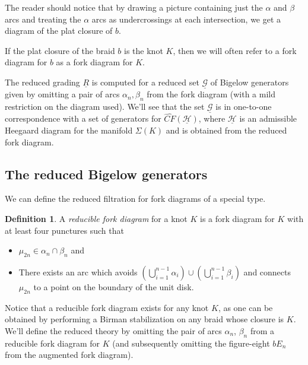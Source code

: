 \documentclass[11pt]{article}
\theoremstyle{plain} \newtheorem{thm}{Theorem}[subsection]
\theoremstyle{plain} \newtheorem{cor}[thm]{Corollary}
\theoremstyle{plain} \newtheorem{prop}[thm]{Proposition}
\theoremstyle{plain} \newtheorem{conj}[thm]{Conjecture}
\theoremstyle{plain} \newtheorem{lem}[thm]{Lemma}
\theoremstyle{definition} \newtheorem{df}[thm]{Definition}
\theoremstyle{remark} \newtheorem{rmk}[thm]{Remark}
\theoremstyle{remark} \newtheorem{obs}[thm]{Observation}
\newcommand{\DBC}[1]{\Sigma(#1)}
\newcommand{\G}{\mathcal{G}}
\newcommand{\h}{\mathcal{H}}
\newcommand{\red}[1]{\underline{#1}}
\numberwithin{equation}{section}
\begin{document}
The reader should notice that by drawing a picture containing just the $\alpha$ and $\beta$ arcs and treating the $\alpha$ arcs as undercrossings at each intersection, we get a diagram of the plat closure of $b$.

If the plat closure of the braid $b$ is the knot $K$, then we will often refer to a fork diagram for $b$ as a fork diagram for $K$.

The reduced grading $\red{R}$ is computed for a reduced set $\red{\G}$ of Bigelow generators given by omitting a pair of arcs $\alpha_{n}, \beta_{n}$ from the fork diagram (with a mild restriction on the diagram used).  We'll see that the set $\red{\G}$ is in one-to-one correspondence with a set of generators for $\widehat{CF}(\red{\h})$, where $\red{\h}$ is an admissible Heegaard diagram for the manifold $\DBC{K}$ and is obtained from the reduced fork diagram.

\subsection{The reduced Bigelow generators}\label{sec:redbig}

We can define the reduced filtration for fork diagrams of a special type.
\begin{df}\label{def:red}
A \textit{reducible fork diagram} for a knot $K$ is a fork diagram for $K$ with at least four punctures such that
\begin{itemize}
\item $\mu_{2n} \in \alpha_{n} \cap \beta_{n}$ and
\item There exists an arc which avoids $\displaystyle \left( \bigcup_{i=1}^{n-1} \alpha_i \right) \cup \left( \bigcup_{i=1}^{n-1}\beta_i \right)$ and connects $\mu_{2n}$ to a point on the boundary of the unit disk.
\end{itemize}
\end{df}

Notice that a reducible fork diagram exists for any knot $K$, as one can be obtained by performing a Birman stabilization on any braid whose closure is $K$.  We'll define the reduced theory by omitting the pair of arcs $\alpha_{n}$, $\beta_{n}$ from a reducible fork diagram for $K$ (and subsequently omitting the figure-eight $bE_{n}$ from the augmented fork diagram).
\end{document}

